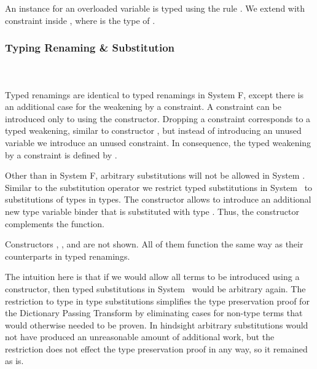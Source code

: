 \noindent An instance for an overloaded variable  is typed using the rule . We extend  with constraint  \Constr{:}  inside , where  is the type of . 

\subsubsection{Typing Renaming \& Substitution}\hfill\\\\
Typed renamings are identical to typed renamings in System F, except there is an additional case for the weakening by a constraint. 
\FoRenTyping
A constraint  \Constr{:}  can be introduced only to  using the  constructor. 
Dropping a constraint corresponds to a typed weakening, similar to constructor , but instead of introducing an unused variable we introduce an unused constraint. In consequence, the typed weakening by a constraint  is defined by  .

\noindent Other than in System F, arbitrary substitutions will not be allowed in System \Fo. 
Similar to the substitution operator we restrict typed substitutions in System \Fo\ to substitutions of types in types. 
\FoSubTyping
\noindent The constructor  allows to introduce an additional new type variable binder that is substituted with type .
Thus, the constructor  complements the  function.  

\noindent Constructors  , ,  and  are not shown. All of them function the same way as their counterparts in typed renamings.

\noindent The intuition here is that if we would allow all terms to be introduced using a  constructor, then typed substitutions in System \Fo\ would be arbitrary again. The restriction to type in type substitutions simplifies the type preservation proof for the Dictionary Passing Transform by eliminating cases for non-type terms that would otherwise needed to be proven. In hindsight arbitrary substitutions would not have produced an unreasonable amount of additional work, but the restriction does not effect the type preservation proof in any way, so it remained as is.  